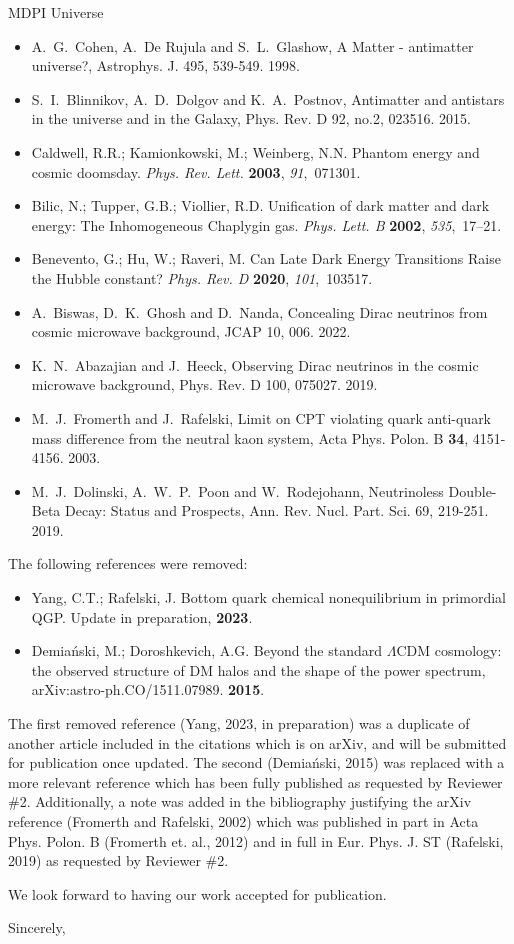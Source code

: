 \documentclass[a4paper, 10pt]{letter}
\begin{document}
\begin{letter}{MDPI Universe}
\begin{itemize}
    \item A.~G.~Cohen, A.~De Rujula and S.~L.~Glashow, {A Matter - antimatter universe?}, Astrophys. J. 495, 539-549. 1998.
    \item S.~I.~Blinnikov, A.~D.~Dolgov and K.~A.~Postnov, {Antimatter and antistars in the universe and in the Galaxy}, Phys. Rev. D 92, no.2, 023516. 2015.
    \item Caldwell, R.R.; Kamionkowski, M.; Weinberg, N.N. {Phantom energy and cosmic doomsday}. {\em Phys. Rev. Lett.} {\bf 2003}, {\em 91},~071301.
    \item Bilic, N.; Tupper, G.B.; Viollier, R.D. {Unification of dark matter and dark energy: The Inhomogeneous Chaplygin gas}. {\em Phys. Lett. B} {\bf 2002}, {\em 535},~17--21.
    \item Benevento, G.; Hu, W.; Raveri, M. {Can Late Dark Energy Transitions Raise the Hubble constant?} {\em Phys. Rev. D} {\bf 2020}, {\em 101},~103517.
    \item A.~Biswas, D.~K.~Ghosh and D.~Nanda, {Concealing Dirac neutrinos from cosmic microwave background}, JCAP 10, 006. 2022.
    \item K.~N.~Abazajian and J.~Heeck, {Observing Dirac neutrinos in the cosmic microwave background}, Phys. Rev. D 100, 075027. 2019.
    \item M.~J.~Fromerth and J.~Rafelski, {Limit on CPT violating quark anti-quark mass difference from the neutral kaon system}, Acta Phys. Polon. B \textbf{34}, 4151-4156. 2003.
    \item M.~J.~Dolinski, A.~W.~P.~Poon and W.~Rodejohann, {Neutrinoless Double-Beta Decay: Status and Prospects}, Ann. Rev. Nucl. Part. Sci. 69, 219-251. 2019.
\end{itemize}

The following references were removed:
\begin{itemize}
    \item Yang, C.T.; Rafelski, J. {Bottom quark chemical nonequilibrium in primordial QGP}. Update in preparation, {\bf 2023}.
    \item Demia\'nski, M.; Doroshkevich, A.G. {Beyond the standard $\Lambda$CDM cosmology: the observed structure of DM halos and the shape of the power spectrum}, arXiv:astro-ph.CO/1511.07989. {\bf 2015}.
\end{itemize}
The first removed reference (Yang, 2023, in preparation) was a duplicate of another article included in the citations which is on arXiv, and will be submitted for publication once updated. The second (Demia\'nski, 2015) was replaced with a more relevant reference which has been fully published as requested by Reviewer \#2. Additionally, a note was added in the bibliography justifying the arXiv reference (Fromerth and Rafelski, 2002) which was published in part in Acta Phys. Polon. B (Fromerth et. al., 2012) and in full in Eur. Phys. J. ST (Rafelski, 2019) as requested by Reviewer \#2.


We look forward to having our work accepted for publication.

\closing{Sincerely,}

\end{letter}
\end{document}
